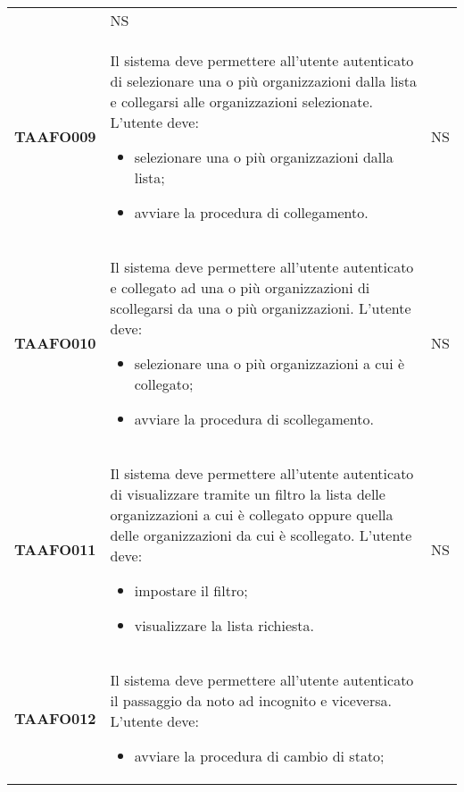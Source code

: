 \documentclass[../piano-di-qualifica.tex]{subfiles}
\begin{document}
\begin{centering}
\begin{longtable}[H]{>{\centering\bfseries}m{3cm} >{}p{10cm} >{\centering\arraybackslash}m{3cm}}
\begin{itemize}
                        \end{itemize}
                      & NS \\
        TAAFO009      & Il sistema deve permettere all'utente autenticato di selezionare una o più organizzazioni dalla lista e collegarsi alle organizzazioni selezionate. \newline
                        L'utente deve:
                        \begin{itemize}
                          \item selezionare una o più organizzazioni dalla lista;
                          \item avviare la procedura di collegamento.
                        \end{itemize}
                      & NS \\
        TAAFO010      & Il sistema deve permettere all'utente autenticato e collegato ad una o più organizzazioni di scollegarsi da una o più organizzazioni. \newline
                        L'utente deve:
                        \begin{itemize}
                          \item selezionare una o più organizzazioni a cui è collegato;
                          \item avviare la procedura di scollegamento.
                        \end{itemize}
                      & NS \\
        TAAFO011      & Il sistema deve permettere all'utente autenticato di visualizzare tramite un filtro la lista delle organizzazioni a cui è collegato oppure quella delle organizzazioni da cui è scollegato. \newline
                      L'utente deve:
                      \begin{itemize}
                        \item impostare il filtro;
                        \item visualizzare la lista richiesta.
                      \end{itemize}
                      & NS \\
        TAAFO012      & Il sistema deve permettere all'utente autenticato il passaggio da noto ad incognito e viceversa. \newline
                      L'utente deve:
                      \begin{itemize}
                        \item avviare la procedura di cambio di stato;

\end{itemize}
\end{longtable}
\end{centering}
\end{document}
